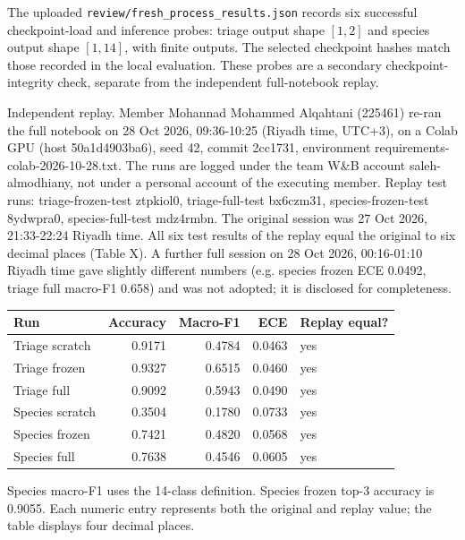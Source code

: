 \documentclass[11pt,a4paper]{article}
\begin{document}
\smallskip
The uploaded \texttt{review/fresh\_process\_results.json} records six successful checkpoint-load and inference probes: triage output shape $[1,2]$ and species output shape $[1,14]$, with finite outputs. The selected checkpoint hashes match those recorded in the local evaluation. These probes are a secondary checkpoint-integrity check, separate from the independent full-notebook replay.

Independent replay. Member Mohannad Mohammed Alqahtani (225461) re-ran the full notebook on 28 Oct 2026, 09:36-10:25 (Riyadh time, UTC+3), on a Colab GPU (host 50a1d4903ba6), seed 42, commit 2cc1731, environment requirements-colab-2026-10-28.txt. The runs are logged under the team W\&B account saleh-almodhiany, not under a personal account of the executing member. Replay test runs: triage-frozen-test ztpkiol0, triage-full-test bx6czm31, species-frozen-test 8ydwpra0, species-full-test mdz4rmbn. The original session was 27 Oct 2026, 21:33-22:24 Riyadh time. All six test results of the replay equal the original to six decimal places (Table X). A further full session on 28 Oct 2026, 00:16-01:10 Riyadh time gave slightly different numbers (e.g. species frozen ECE 0.0492, triage full macro-F1 0.658) and was not adopted; it is disclosed for completeness.

\begin{center}
\begin{tabularx}{\linewidth}{@{}Y r r r l@{}}
\toprule
Run & Accuracy & Macro-F1 & ECE & Replay equal? \\
\midrule
Triage scratch & 0.9171 & 0.4784 & 0.0463 & yes \\
Triage frozen & 0.9327 & 0.6515 & 0.0460 & yes \\
Triage full & 0.9092 & 0.5943 & 0.0490 & yes \\
Species scratch & 0.3504 & 0.1780 & 0.0733 & yes \\
Species frozen & 0.7421 & 0.4820 & 0.0568 & yes \\
Species full & 0.7638 & 0.4546 & 0.0605 & yes \\
\bottomrule
\end{tabularx}
\end{center}
Species macro-F1 uses the 14-class definition. Species frozen top-3 accuracy is 0.9055. Each numeric entry represents both the original and replay value; the table displays four decimal places.
\end{document}
